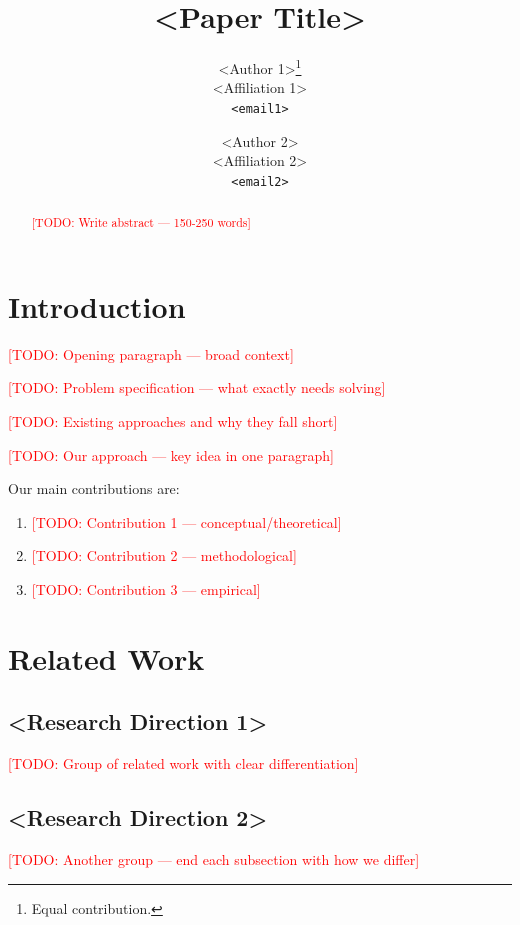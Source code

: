 \documentclass[11pt,a4paper]{article}
\title{<Paper Title>}
\author{
  <Author 1>\thanks{Equal contribution.} \\
  <Affiliation 1> \\
  \texttt{<email1>} \\
  \and
  <Author 2> \\
  <Affiliation 2> \\
  \texttt{<email2>} \\
}
\date{}
\newcommand{\todo}[1]{\textcolor{red}{[TODO: #1]}}
\begin{document}
\maketitle

\begin{abstract}
\todo{Write abstract — 150-250 words}
\end{abstract}

\section{Introduction}
\label{sec:intro}

\todo{Opening paragraph — broad context}

\todo{Problem specification — what exactly needs solving}

\todo{Existing approaches and why they fall short}

\todo{Our approach — key idea in one paragraph}

\noindent Our main contributions are:
\begin{enumerate}
    \item \todo{Contribution 1 — conceptual/theoretical}
    \item \todo{Contribution 2 — methodological}
    \item \todo{Contribution 3 — empirical}
\end{enumerate}

\section{Related Work}
\label{sec:related}

\subsection{<Research Direction 1>}
\todo{Group of related work with clear differentiation}

\subsection{<Research Direction 2>}
\todo{Another group — end each subsection with how we differ}

\end{document}
